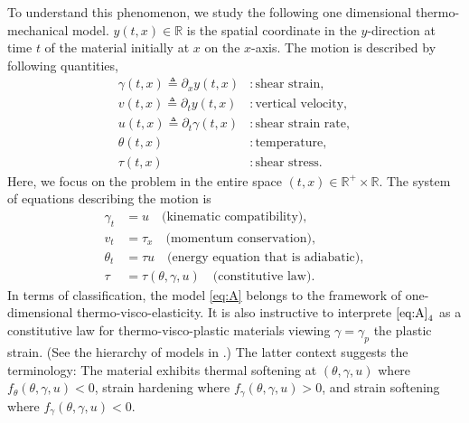 \documentclass[graybox]{svmult}
\begin{document}
To understand this phenomenon, we study the following one dimensional thermo-mechanical model. $y(t,x)\in \mathbb{R}$ is the spatial coordinate in the $y$-direction at time $t$ of the material initially at $x$ on the $x$-axis. The motion is described by following quantities,
\begin{equation} \label{eq:vars}
\begin{aligned}
 \gamma(t,x) \triangleq \partial_x y(t,x)&: \text{shear strain},\\
 v(t,x)\triangleq \partial_t y(t,x) &: \text{vertical velocity},\\
 u(t,x)\triangleq \partial_t\gamma(t,x) &: \text{shear strain rate},\\
 \theta(t,x) &: \text{temperature},\\
 \tau(t,x) &: \text{shear stress}.
\end{aligned}
\end{equation}
Here, we focus on the problem in the entire space $(t,x) \in \mathbb{R}^+\times \mathbb{R}$.
The system of equations describing the motion is
\begin{equation} \label{eq:A}\tag{A}
\begin{aligned}
 \gamma_t &= u \quad \text{(kinematic compatibility)}, 	\\
 v_t &= \tau_x \quad \text{(momentum conservation)}, 	\\
 \theta_t &= \tau u \quad \text{(energy equation that is adiabatic)},	\\
 \tau &=\tau(\theta,\gamma,u) \quad \text{(constitutive law)}.			
\end{aligned}
\end{equation}
In terms of classification, the model \eqref{eq:A} belongs to the framework of one-dimensional thermo-visco-elasticity. 
It is also instructive to interprete $\eqref{eq:A}_4$ as a constitutive law for thermo-visco-plastic materials viewing $\gamma=\gamma_p$ the plastic strain. (See the hierarchy of models in \cite{KT09,tzavaras_nonlinear_1992}.)
The latter context suggests the terminology: The material exhibits thermal softening at $(\theta,\gamma,u)$ where $f_\theta(\theta,\gamma,u)<0$, strain hardening where $f_\gamma(\theta,\gamma,u)>0$, and strain softening where $f_\gamma(\theta,\gamma,u)<0$.
\end{document}
